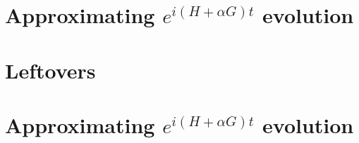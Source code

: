 \documentclass{article}
\begin{document}
\section{Approximating $e^{i (H + \alpha G) t}$ evolution}


\section{Leftovers}




\section{Approximating $e^{i (H + \alpha G) t}$ evolution}




\appendix
\end{document}
